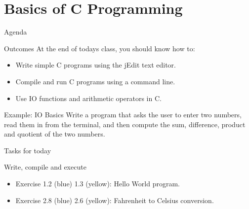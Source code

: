 \documentclass{beamer}
\begin{document}
\section{Basics of C Programming}

\begin{frame}{Agenda}
    \begin{block}{Outcomes}
        At the end of todays class, you should know how to:
        \begin{itemize}
            \item Write simple C programs using the jEdit text editor.
            \item Compile and run C programs using a command line.
            \item Use IO functions and arithmetic operators in C.
        \end{itemize}
    \end{block}
\end{frame}

\begin{frame}{Example: IO Basics}
    Write a program that asks the user to enter two numbers, read them in
    from the terminal, and then compute the sum, difference, product and
    quotient of the two numbers.
\end{frame}

\begin{frame}{Tasks for today}
    \begin{block}{Write, compile and execute}
        \begin{itemize}
            \item Exercise 1.2 (blue) 1.3 (yellow): Hello World program.
            \item Exercise 2.8 (blue) 2.6 (yellow): Fahrenheit to Celsius
                conversion.
        \end{itemize}
    \end{block}
\end{frame}
\end{document}
